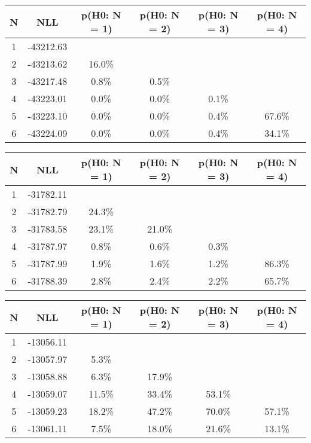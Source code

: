 \begin{table}[htb]
	\begin{center}
{\footnotesize\renewcommand{\arraystretch}{1.4}
		\begin{tabular}{cc||cccc}
			N & NLL & p(H0: N = 1) & p(H0: N = 2) & p(H0: N = 3) & p(H0: N = 4)\\ 
		\hline
1 & -43212.63 & & & & \\
2 & -43213.62 & 16.0\% & & & \\
3 & -43217.48 & 0.8\% & 0.5\% & & \\
4 & -43223.01 & 0.0\% & 0.0\% & 0.1\% & \\
5 & -43223.10 & 0.0\% & 0.0\% & 0.4\% & 67.6\% \\
6 & -43224.09 & 0.0\% & 0.0\% & 0.4\% & 34.1\% \\
	\end{tabular}
		\label{tab:lab}
	}
	\end{center}\end{table}

\begin{table}[htb]
	\begin{center}
{\footnotesize\renewcommand{\arraystretch}{1.4}
		\begin{tabular}{cc||cccc}
			N & NLL & p(H0: N = 1) & p(H0: N = 2) & p(H0: N = 3) & p(H0: N = 4)\\ 
		\hline
1 & -31782.11 & & & & \\
2 & -31782.79 & 24.3\% & & & \\
3 & -31783.58 & 23.1\% & 21.0\% & & \\
4 & -31787.97 & 0.8\% & 0.6\% & 0.3\% & \\
5 & -31787.99 & 1.9\% & 1.6\% & 1.2\% & 86.3\% \\
6 & -31788.39 & 2.8\% & 2.4\% & 2.2\% & 65.7\% \\
	\end{tabular}
		\label{tab:lab}
	}
	\end{center}\end{table}

\begin{table}[htb]
	\begin{center}
{\footnotesize\renewcommand{\arraystretch}{1.4}
		\begin{tabular}{cc||cccc}
			N & NLL & p(H0: N = 1) & p(H0: N = 2) & p(H0: N = 3) & p(H0: N = 4)\\ 
		\hline
1 & -13056.11 & & & & \\
2 & -13057.97 & 5.3\% & & & \\
3 & -13058.88 & 6.3\% & 17.9\% & & \\
4 & -13059.07 & 11.5\% & 33.4\% & 53.1\% & \\
5 & -13059.23 & 18.2\% & 47.2\% & 70.0\% & 57.1\% \\
6 & -13061.11 & 7.5\% & 18.0\% & 21.6\% & 13.1\% \\
	\end{tabular}
		\label{tab:lab}
	}
	\end{center}\end{table}

